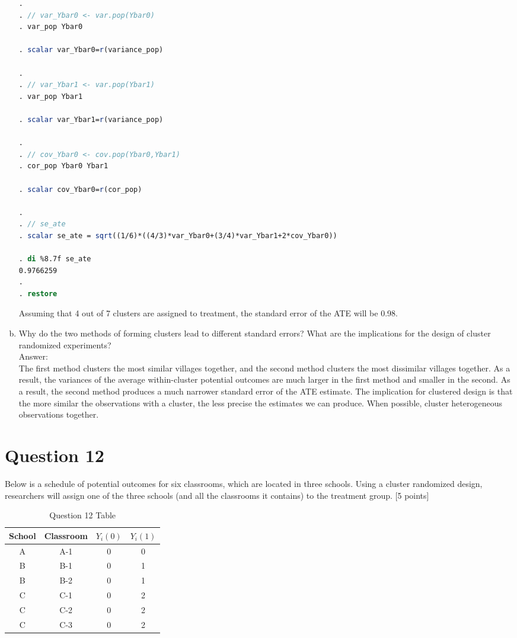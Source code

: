 \documentclass[11pt,notitlepage]{article}\usepackage[]{graphicx}\usepackage[]{color}
\begin{document}
\begin{enumerate}[a)]
\begin{lstlisting}[language=stata]
.         
. // var_Ybar0 <- var.pop(Ybar0)  
. var_pop Ybar0

. scalar var_Ybar0=r(variance_pop)

. 
. // var_Ybar1 <- var.pop(Ybar1)
. var_pop Ybar1

. scalar var_Ybar1=r(variance_pop)

. 
. // cov_Ybar0 <- cov.pop(Ybar0,Ybar1)
. cor_pop Ybar0 Ybar1

. scalar cov_Ybar0=r(cor_pop)

. 
. // se_ate
. scalar se_ate = sqrt((1/6)*((4/3)*var_Ybar0+(3/4)*var_Ybar1+2*cov_Ybar0))

. di %8.7f se_ate
0.9766259
. 
. restore 
\end{lstlisting}


Assuming that 4 out of 7 clusters are assigned to treatment, the standard error of the ATE will be 0.98.

\item Why do the two methods of forming clusters lead to different standard errors? What are the implications for the design of cluster randomized experiments?\\
Answer:\\
The first method clusters the most similar villages together, and the second method clusters the most dissimilar villages together. As a result, the variances of the average within-cluster potential outcomes are much larger in the first method and smaller in the second. As a result, the second method produces a much narrower standard error of the ATE estimate. The implication for clustered design is that the more similar the observations with a cluster, the less precise the estimates we can produce. When possible, cluster heterogeneous observations together.
\end{enumerate}

\section*{Question 12}
Below is a schedule of potential outcomes for six classrooms, which are located in three schools.  Using a cluster randomized design, researchers will assign one of the three schools (and all the classrooms it contains) to the treatment group. [5 points]

\begin{table}[H]
  \centering
  \caption{Question 12 Table}
    \begin{tabular}{cccc}
    \toprule
    School & Classroom & $Y_i(0)$ & $Y_i(1)$ \\
    \midrule
    A     & A-1   & 0     & 0 \\
    B     & B-1   & 0     & 1 \\
    B     & B-2   & 0     & 1 \\
    C     & C-1   & 0     & 2 \\
    C     & C-2   & 0     & 2 \\
    C     & C-3   & 0     & 2 \\
    \bottomrule
    \end{tabular}%
  \label{tab:addlabel}%
\end{table}%
\end{document}
